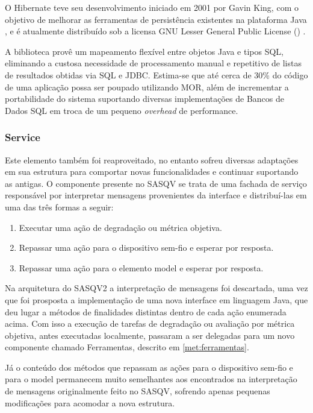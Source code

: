 O Hibernate teve seu desenvolvimento iniciado em 2001 por Gavin King, com o objetivo de melhorar as ferramentas de persistência existentes na plataforma Java \cite{hibernateHistory}, e é atualmente distribuído sob a licensa GNU Lesser General Public License () \cite{hibernateAbout}.

A biblioteca provê um mapeamento flexível entre objetos Java e tipos SQL, eliminando a custosa necessidade de processamento manual e repetitivo de listas de resultados obtidas via SQL e JDBC.
Estima-se que até cerca de 30\% do código de uma aplicação possa ser poupado utilizando MOR, além de incrementar a portabilidade do sistema suportando diversas implementações de Bancos de Dados SQL em troca de um pequeno \emph{overhead} de performance.

\subsubsection{Service}

Este elemento também foi reaproveitado, no entanto sofreu diversas adaptações em sua estrutura para comportar novas funcionalidades e continuar suportando as antigas.
O componente presente no SASQV se trata de uma fachada de serviço responsável por interpretar mensagens provenientes da interface e distribuí-las em uma das três formas a seguir:

\begin{enumerate}
	\item Executar uma ação de degradação ou métrica objetiva.
	\item Repassar uma ação para o dispositivo sem-fio e esperar por resposta.
	\item Repassar uma ação para o elemento model e esperar por resposta.
\end{enumerate}

Na arquitetura do SASQV2 a interpretação de mensagens foi descartada, uma vez que foi prosposta a implementação de uma nova interface em linguagem Java, que deu lugar a métodos de finalidades distintas dentro de cada ação enumerada acima. 
Com isso a execução de tarefas de degradação ou avaliação por métrica objetiva, antes executadas localmente, passaram a ser delegadas para um novo componente chamado Ferramentas, descrito em \ref{met:ferramentas}.

Já o conteúdo dos métodos que repassam as ações para o dispositivo sem-fio e para o model permanecem muito semelhantes aos encontrados na interpretação de mensagens originalmente feito no SASQV, sofrendo apenas pequenas modificações para acomodar a nova estrutura.

